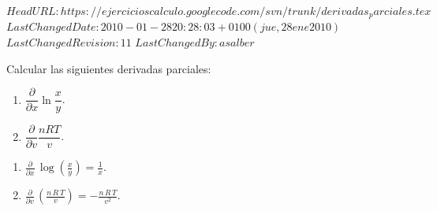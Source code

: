 \svnidlong
{$HeadURL: https://ejercicioscalculo.googlecode.com/svn/trunk/derivadas_parciales.tex $}
{$LastChangedDate: 2010-01-28 20:28:03 +0100 (jue, 28 ene 2010) $}
{$LastChangedRevision: 11 $}
{$LastChangedBy: asalber $}
%
{Calcular las siguientes derivadas parciales:
\begin{multicols}{2}
\begin{enumerate}
\item $\dfrac{\partial}{\partial x}\ln \dfrac{x}{y}$.
\item $\dfrac{\partial}{\partial v}\dfrac{nRT}{v}$.
\end{enumerate}
\end{multicols}
}
{\begin{enumerate}

\item $\frac{\partial}{\partial x}\,\log \left(\frac{x}{y}\right) = \frac{1}{x}$.
\item $\frac{\partial}{\partial v}\,\left(\frac{n\,R\,T}{v}\right) = -\frac{n\,R\,T}{v^2}$.
\end{enumerate}
}
{
}


